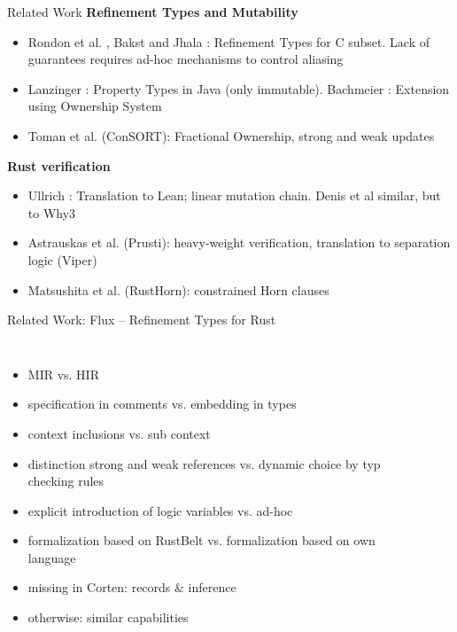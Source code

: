 \documentclass{sdqbeamer}
\begin{document}
\begin{frame}{Related Work}
  \textbf{Refinement Types and Mutability}
  \begin{itemize}
    \item Rondon et al. \cite{rondon_low-level_2010}, Bakst and Jhala \cite{bakst_predicate_2016}: Refinement Types for C subset. Lack of guarantees requires ad-hoc mechanisms to control aliasing
    \item Lanzinger \cite{lanzinger_property_2021}: Property Types in Java (only immutable). Bachmeier \cite{bachmeier_property_2022}: Extension using Ownership System
    \item Toman et al. \cite{toman_consort_2020} (ConSORT): Fractional Ownership, strong and weak updates
  \end{itemize}
  \textbf{Rust verification}
  \begin{itemize}
    \item Ullrich \cite{ullrich_simple_2016}: Translation to Lean; linear mutation chain. Denis et al \cite{denis_creusot_2021} similar, but to Why3
    \item Astrauskas et al. \cite{astrauskas_leveraging_2019} (Prusti): heavy-weight verification, translation to separation logic (Viper)
    \item Matsushita et al. \cite{matsushita_rusthorn_2020} (RustHorn): constrained Horn clauses 
  \end{itemize}
\end{frame}

\begin{frame}{Related Work: Flux -- Refinement Types for Rust}
  \begin{columns}
    \begin{itemize}
      \item MIR vs. HIR
      \item specification in comments vs. embedding in types
      \item context inclusions vs. sub context
      \item distinction strong and weak references vs. dynamic choice by typ checking rules
      \item explicit introduction of logic variables vs. ad-hoc
      \item formalization based on RustBelt vs. formalization based on own language
      \item missing in Corten: records \& inference
      \item otherwise: similar capabilities
    \end{itemize}

    \inputminted[]{rust}{./snippets/flux-comparison-1.rs}
    
    \inputminted[]{rust}{./snippets/flux-comparison-2.rs}
    
  \end{columns}
\end{frame}
\end{document}
